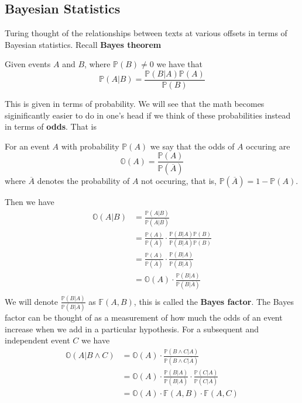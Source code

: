 \subsection{Bayesian Statistics}
Turing thought of the relationships between texts at various
offsets in terms of Bayesian statistics. Recall {\bf{Bayes theorem}}
\begin{theorem}
	Given events $A$ and $B$, where $\mathbb{P}(B) \ne 0$ we have that
	\[
		\mathbb{P}(A|B) = \frac{\mathbb{P}(B|A)\mathbb{P}(A)}{\mathbb{P}(B)}
	\]
\end{theorem}
\noindent This is given in terms of probability. We will see that
the math becomes siginificantly easier to do in one's head if we
think of these probabilities instead in terms of {\bf{odds}}. That is
\begin{definition}
	For an event $A$ with probability $\mathbb{P}(A)$ we say that the
	odds of $A$ occuring are
	\[
		\mathbb{O}(A) = \frac{\mathbb{P}(A)}{\mathbb{P}(\overline{A})}
	\]
	where $\overline{A}$ denotes the probability of $A$ not occuring,
	that is, $\mathbb{P}(\overline{A}) = 1-\mathbb{P}(A)$.
\end{definition}
\noindent Then we have
\begin{align*}
	\mathbb{O}(A|B) & =
	\frac{\mathbb{P}(A|B)}{\mathbb{P}(\overline{A}|B)}
	\\
	                & =
	\frac{\mathbb{P}(A)}{\mathbb{P}(\overline{A})}\cdot\frac{\mathbb{P}(B|A)\mathbb{P}(B)}{\mathbb{P}(B|\overline{A})\mathbb{P}(B)}
	\\
	                & =
	\frac{\mathbb{P}(A)}{\mathbb{P}(\overline{A})}\cdot\frac{\mathbb{P}(B|A)}{\mathbb{P}(B|\overline{A})}
	\\
	                & =
	\mathbb{O}(A)\cdot\frac{\mathbb{P}(B|A)}{\mathbb{P}(B|\overline{A})}
	\\
\end{align*}
\noindent We will denote
$\frac{\mathbb{P}(B|A)}{\mathbb{P}(B|\overline{A})}$ as
$\mathbb{F}(A,B)$, this is called the {\bf{Bayes factor}}. The
Bayes factor can be thought of as a measurement of how much the
odds of an event increase when we add in a particular hypothesis.
For a subsequent and independent event $C$ we have
\begin{align*}
	\mathbb{O}(A|B\wedge C) & =
	\mathbb{O}(A)\cdot\frac{\mathbb{P}(B\wedge C|
		A)}{\mathbb{P}(B\wedge C| \overline{A})}
	\\
	                        & = \mathbb{O}(A)\cdot\frac{\mathbb{P}(B| A)}{\mathbb{P}(B|
	\overline{A})}\cdot\frac{\mathbb{P}(C|A)}{\mathbb{P}(C|\overline{A})}                \\
	                        & = \mathbb{O}(A)\cdot \mathbb{F}(A,B) \cdot \mathbb{F}(A,C)
\end{align*}

